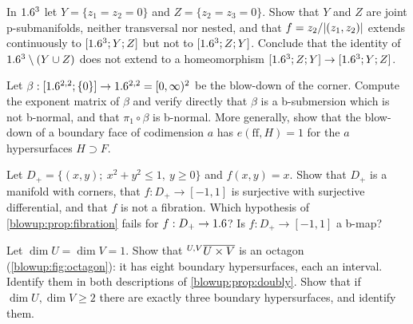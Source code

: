 \begin{exercise}\label{blowup:ex:noncommute}
In $1.6^3$ let $Y=\{z_1=z_2=0\}$ and $Z=\{z_2=z_3=0\}$. Show that $Y$ and $Z$ are joint
p-submanifolds, neither transversal nor nested, and that $f=z_2/\lvert (z_1,z_2)\rvert$ extends
continuously to $[1.6^3;Y;Z]$ but not to $[1.6^3;Z;Y]$. Conclude that the identity of
$1.6^3\setminus(Y\cup Z)$ does not extend to a homeomorphism $[1.6^3;Z;Y]\to[1.6^3;Y;Z]$.
\end{exercise}

\begin{exercise}\label{blowup:ex:corner-exponents}
Let $\beta:[1.6^{2,2};\{0\}]\to1.6^{2,2}=[0,\infty)^2$ be the blow-down of the corner. Compute
the exponent matrix of $\beta$ and verify directly that $\beta$ is a b-submersion which is
not b-normal, and that $\pi_1\circ\beta$ is b-normal. More generally, show that the blow-down of
a boundary face of codimension $a$ has $e(\mathrm{ff},H)=1$ for the $a$ hypersurfaces
$H\supset F$.
\end{exercise}

\begin{exercise}\label{blowup:ex:half-disc}
Let $D_+=\{(x,y);\ x^2+y^2\le1,\ y\ge0\}$ and $f(x,y)=x$. Show that $D_+$ is a manifold with
corners, that $f:D_+\to[-1,1]$ is surjective with surjective differential, and that $f$ is
not a fibration. Which hypothesis of \cref{blowup:prop:fibration} fails for
$f:D_+\to1.6$? Is $f:D_+\to[-1,1]$ a b-map?
\end{exercise}

\begin{exercise}\label{blowup:ex:octagon}
Let $\dim U=\dim V=1$. Show that ${}^{U,V}\overline{U\times V}$ is an octagon
(\cref{blowup:fig:octagon}): it has eight boundary hypersurfaces, each an interval.
Identify them in both descriptions of \cref{blowup:prop:doubly}. Show that if $\dim U,\dim
V\ge2$ there are exactly three boundary hypersurfaces, and identify them.
\end{exercise}

